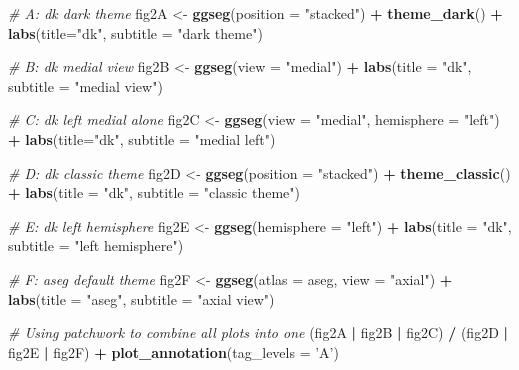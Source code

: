 \documentclass[fleqn,10pt]{wlpeerj} %
\newenvironment{Shaded}{\begin{snugshade}}{\end{snugshade}}
\newcommand{\CommentTok}[1]{\textcolor[rgb]{0.56,0.35,0.01}{\textit{#1}}}
\newcommand{\DataTypeTok}[1]{\textcolor[rgb]{0.13,0.29,0.53}{#1}}
\newcommand{\KeywordTok}[1]{\textcolor[rgb]{0.13,0.29,0.53}{\textbf{#1}}}
\newcommand{\NormalTok}[1]{#1}
\newcommand{\OperatorTok}[1]{\textcolor[rgb]{0.81,0.36,0.00}{\textbf{#1}}}
\newcommand{\StringTok}[1]{\textcolor[rgb]{0.31,0.60,0.02}{#1}}
\begin{document}
\begin{Shaded}
\begin{Highlighting}[]
\CommentTok{# A: dk dark theme}
\NormalTok{fig2A <-}\StringTok{ }\KeywordTok{ggseg}\NormalTok{(}\DataTypeTok{position =} \StringTok{"stacked"}\NormalTok{) }\OperatorTok{+}
\StringTok{  }\KeywordTok{theme_dark}\NormalTok{() }\OperatorTok{+}
\StringTok{  }\KeywordTok{labs}\NormalTok{(}\DataTypeTok{title=}\StringTok{"dk"}\NormalTok{, }\DataTypeTok{subtitle =} \StringTok{"dark theme"}\NormalTok{)}

\CommentTok{# B: dk medial view}
\NormalTok{fig2B <-}\StringTok{ }\KeywordTok{ggseg}\NormalTok{(}\DataTypeTok{view =} \StringTok{"medial"}\NormalTok{) }\OperatorTok{+}
\StringTok{  }\KeywordTok{labs}\NormalTok{(}\DataTypeTok{title =} \StringTok{"dk"}\NormalTok{, }\DataTypeTok{subtitle =} \StringTok{"medial view"}\NormalTok{)}

\CommentTok{# C: dk left medial alone}
\NormalTok{fig2C <-}\StringTok{ }\KeywordTok{ggseg}\NormalTok{(}\DataTypeTok{view =} \StringTok{"medial"}\NormalTok{,}
            \DataTypeTok{hemisphere =} \StringTok{"left"}\NormalTok{) }\OperatorTok{+}
\StringTok{  }\KeywordTok{labs}\NormalTok{(}\DataTypeTok{title=}\StringTok{"dk"}\NormalTok{, }\DataTypeTok{subtitle =} \StringTok{"medial left"}\NormalTok{)}

\CommentTok{# D: dk classic theme}
\NormalTok{fig2D <-}\StringTok{ }\KeywordTok{ggseg}\NormalTok{(}\DataTypeTok{position =} \StringTok{"stacked"}\NormalTok{) }\OperatorTok{+}
\StringTok{  }\KeywordTok{theme_classic}\NormalTok{() }\OperatorTok{+}
\StringTok{  }\KeywordTok{labs}\NormalTok{(}\DataTypeTok{title =} \StringTok{"dk"}\NormalTok{, }\DataTypeTok{subtitle =} \StringTok{"classic theme"}\NormalTok{)}


\CommentTok{# E: dk left hemisphere}
\NormalTok{fig2E <-}\StringTok{ }\KeywordTok{ggseg}\NormalTok{(}\DataTypeTok{hemisphere =} \StringTok{"left"}\NormalTok{) }\OperatorTok{+}
\StringTok{  }\KeywordTok{labs}\NormalTok{(}\DataTypeTok{title =} \StringTok{"dk"}\NormalTok{, }\DataTypeTok{subtitle =} \StringTok{"left hemisphere"}\NormalTok{)}

\CommentTok{# F: aseg default theme}
\NormalTok{fig2F <-}\StringTok{ }\KeywordTok{ggseg}\NormalTok{(}\DataTypeTok{atlas =}\NormalTok{ aseg, }\DataTypeTok{view =} \StringTok{"axial"}\NormalTok{) }\OperatorTok{+}
\StringTok{  }\KeywordTok{labs}\NormalTok{(}\DataTypeTok{title =} \StringTok{"aseg"}\NormalTok{, }\DataTypeTok{subtitle =} \StringTok{"axial view"}\NormalTok{)}

\CommentTok{# Using patchwork to combine all plots into one}
\NormalTok{(fig2A }\OperatorTok{|}\StringTok{ }\NormalTok{fig2B }\OperatorTok{|}\StringTok{ }\NormalTok{fig2C) }\OperatorTok{/}\StringTok{ }\NormalTok{(fig2D }\OperatorTok{|}\StringTok{ }\NormalTok{fig2E }\OperatorTok{|}\StringTok{ }\NormalTok{fig2F) }\OperatorTok{+}
\StringTok{  }\KeywordTok{plot_annotation}\NormalTok{(}\DataTypeTok{tag_levels =} \StringTok{'A'}\NormalTok{)}
\end{Highlighting}
\end{Shaded}
\end{document}
